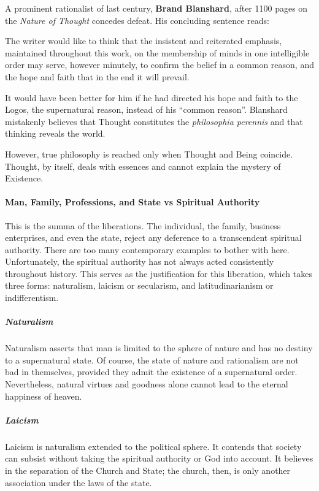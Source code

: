 A prominent rationalist of last century, \textbf{Brand Blanshard}, after 1100 pages on the \emph{Nature of Thought} concedes defeat. His concluding sentence reads:

\begin{quotex}
The writer would like to think that the insistent and reiterated emphasis, maintained throughout this work, on the membership of minds in one intelligible order may serve, however minutely, to confirm the belief in a common reason, and the hope and faith that in the end it will prevail.
\end{quotex}


It would have been better for him if he had directed his hope and faith to the Logos, the supernatural reason, instead of his ``common reason''. Blanshard mistakenly believes that Thought constitutes the \emph{philosophia perennis} and that thinking reveals the world.

However, true philosophy is reached only when Thought and Being coincide. Thought, by itself, deals with essences and cannot explain the mystery of Existence.

\paragraph{Man, Family, Professions, and State vs Spiritual Authority}


This is the summa of the liberations. The individual, the family, business enterprises, and even the state, reject any deference to a transcendent spiritual authority. There are too many contemporary examples to bother with here. Unfortunately, the spiritual authority has not always acted consistently throughout history. This serves as the justification for this liberation, which takes three forms: naturalism, laicism or secularism, and latitudinarianism or indifferentism.

\subparagraph{Naturalism}


Naturalism asserts that man is limited to the sphere of nature and has no destiny to a supernatural state. Of course, the state of nature and rationalism are not bad in themselves, provided they admit the existence of a supernatural order. Nevertheless, natural virtues and goodness alone cannot lead to the eternal happiness of heaven.

\subparagraph{Laicism}


Laicism is naturalism extended to the political sphere. It contends that society can subsist without taking the spiritual authority or God into account. It believes in the separation of the Church and State; the church, then, is only another association under the laws of the state.

